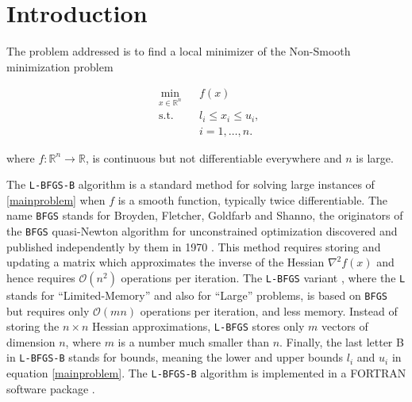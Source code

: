 
\chapter{Introduction} %

\label{Chapter1} %


The problem addressed is to find a local minimizer of the Non-Smooth minimization problem

\begin{equation} \label{mainproblem}
  \begin{aligned}
    & \underset{x \in \mathbb{R}^n}{\text{min}}
    & & f(x) \\
    & \text{s.t.}
    & & l_i \leq x_i \leq u_i , \; \\
    & & & i = 1, \ldots, n.
  \end{aligned}
\end{equation}

where $f \colon \mathbb{R}^n \to \mathbb{R}$, is continuous but not differentiable everywhere and $n$ is large.

The \texttt{L-BFGS-B} algorithm \citep{lbfgsboriginal} is a standard method for solving large instances of \eqref{mainproblem} when $f$ is a smooth function, typically twice differentiable. The name \texttt{BFGS} stands for Broyden, Fletcher, Goldfarb and Shanno, the originators
of the \texttt{BFGS} quasi-Newton algorithm for unconstrained
optimization discovered and published
independently by them in 1970 \citep{Broyden, Fletcher, Goldfarb, Shanno}.
This method requires storing and updating a matrix which 
approximates the inverse of the Hessian $\nabla^2 f(x)$ and
hence requires $\mathcal{O}(n^2)$ operations per iteration.  
The \texttt{L-BFGS} variant \citep{MR572855}, where the \texttt{L} stands for ``Limited-Memory'' and also for ``Large'' problems, is based on \texttt{BFGS} but requires only $\mathcal{O}(mn)$ operations per iteration, and less memory. Instead of storing the $n \times n$ Hessian approximations, \texttt{L-BFGS} stores only $m$ vectors of dimension $n$, where $m$ is a number much smaller than $n$. Finally, the last letter B in 
\texttt{L-BFGS-B} stands for bounds, meaning the lower and upper
bounds $l_i$ and $u_i$ in equation \eqref{mainproblem}.  The \texttt{L-BFGS-B} algorithm is implemented in a FORTRAN software package \citep{lbfgsbsoftware}.

